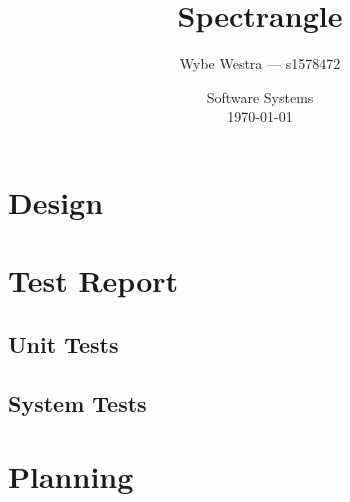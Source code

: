 \documentclass[12pt, letterpaper]{article}
\title{Spectrangle}
\author{Wybe Westra --- s1578472}
\date{Software Systems \\ \today}
\begin{document}
    \maketitle

    \newpage

    \tableofcontents

    \newpage


    \section{Design}


    \section{Test Report}

    \subsection{Unit Tests}

    \subsection{System Tests}

    \section{Planning}

\end{document}
